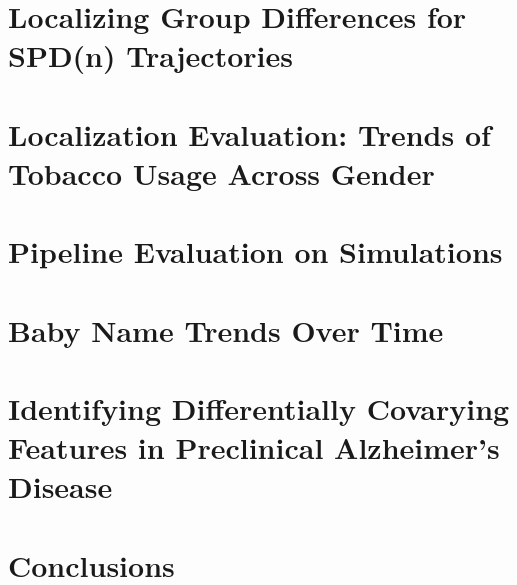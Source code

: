 \section{Localizing Group Differences for SPD(n) Trajectories}
\label{sec:loc}

\section{Localization Evaluation: Trends of Tobacco Usage Across Gender}
\label{sec:loceval}

\section{Pipeline Evaluation on Simulations}
\label{sec:pipeval}

\section{Baby Name Trends Over Time}
\label{sec:baby}

\section{Identifying Differentially Covarying Features in Preclinical Alzheimer's Disease}
\label{sec:wrap}

\section{Conclusions}

